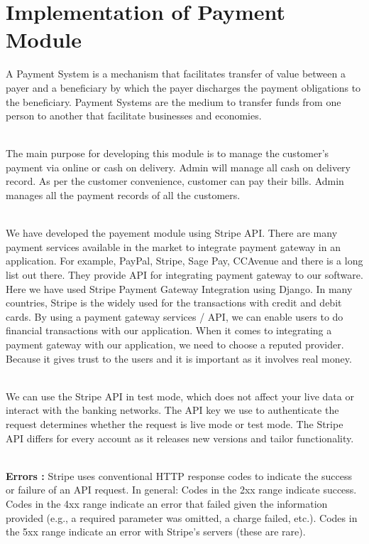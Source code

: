 \documentclass[12pt,a4paper]{report}
\begin{document}
\section{Implementation of Payment Module}
\hspace{0.25cm}
\par
A Payment System is a mechanism that facilitates transfer of value between a payer and a beneficiary by which the payer discharges the payment obligations to the beneficiary. Payment Systems are the medium to transfer funds from one person to another that facilitate businesses and economies.
\\
\\
\par
The main purpose for developing this module is to manage the customer's payment via online or cash on delivery. Admin will manage all cash on delivery record. As per the customer convenience, customer can pay their bills. Admin manages all the payment records of all the customers. 
\\
\\
\par
We have developed the payement module using  Stripe API. There are many payment services available in the market to integrate
payment gateway in an application. For example, PayPal, Stripe, Sage Pay, CCAvenue and
there is a long list out there. They provide API for integrating payment gateway to our
software. Here we have used Stripe Payment Gateway Integration using Django. In many
countries, Stripe is the widely used for the transactions with credit and debit cards. By using a payment gateway services / API, we can enable users to do
financial transactions with our application. When it comes to integrating a payment
gateway with our application, we need to choose a reputed provider. Because it gives trust
to the users and it is important as it involves real money.
\\
\\
\par
We can use the Stripe API in test mode, which does not affect your live data or interact with the banking networks. The API key we use to authenticate the request determines whether the request is live mode or test mode. The Stripe API differs for every account as it releases new versions and tailor functionality.
\\
\\
\par
\textbf{Errors :}
Stripe uses conventional HTTP response codes to indicate the success or failure of an API request. In general: Codes in the 2xx range indicate success. Codes in the 4xx range indicate an error that failed given the information provided (e.g., a required parameter was omitted, a charge failed, etc.). Codes in the 5xx range indicate an error with Stripe's servers (these are rare).
\end{document}
